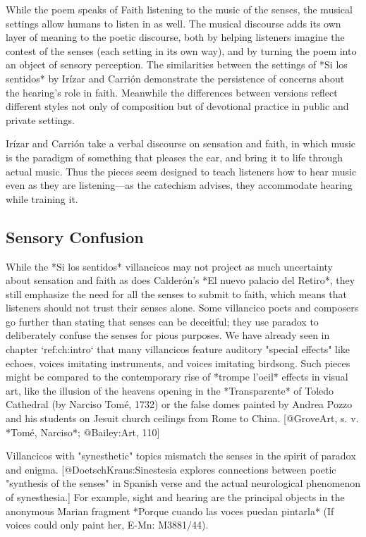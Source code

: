 While the poem speaks of Faith listening to the music of the senses, the musical
settings allow humans to listen in as well.
The musical discourse adds its own layer of meaning to the poetic discourse,
both by helping listeners imagine the contest of the senses (each setting in its
own way), and by turning the poem into an object of sensory perception.
The similarities between the settings of *Si los sentidos* by Irízar and Carrión
demonstrate the persistence of concerns about the hearing's role in faith. 
Meanwhile the differences between versions reflect different styles not only of
composition but of devotional practice in public and private settings.

Irízar and Carrión take a verbal discourse on sensation and faith, in which
music is the paradigm of something that pleases the ear, and bring it to life
through actual music. 
Thus the pieces seem designed to teach listeners how to hear music even as they
are listening---as the catechism advises, they accommodate hearing while
training it.


\subsection{Sensory Confusion}

While the *Si los sentidos* villancicos may not project as much uncertainty
about sensation and faith as does Calderón's *El nuevo palacio del Retiro*, they
still emphasize the need for all the senses to submit to faith, which means that
listeners should not trust their senses alone. 
Some villancico poets and composers go further than stating that senses can be
deceitful; they use paradox to deliberately confuse the senses for pious
purposes. 
We have already seen in chapter `ref:ch:intro` that many villancicos feature
auditory "special effects" like echoes, voices imitating instruments, and voices
imitating birdsong. 
Such pieces might be compared to the contemporary rise of *trompe l'oeil*
effects in visual art, like the illusion of the heavens opening in the
*Transparente* of Toledo Cathedral (by Narciso Tomé, 1732) or the false domes
painted by Andrea Pozzo and his students on Jesuit church ceilings from Rome to
China.
[@GroveArt, s. v. *Tomé, Narciso*; @Bailey:Art, 110]

Villancicos with "synesthetic" topics mismatch the senses in the spirit of
paradox and enigma. 
[@DoetschKraus:Sinestesia explores connections between poetic "synthesis of the
senses" in Spanish verse and the actual neurological phenomenon of synesthesia.]
For example, sight and hearing are the principal objects in the anonymous
Marian fragment *Porque cuando las voces puedan pintarla* (If voices could only
paint her, E-Mn: M3881/44).

